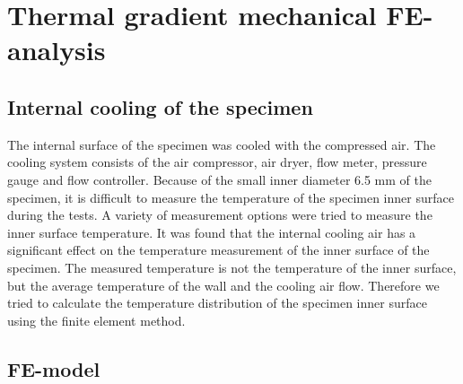 \documentclass[preprint,5p,twocolumn,11pt,sort&compress]{elsarticle}
\begin{document}
\section{Thermal gradient mechanical FE-analysis}

\subsection{Internal cooling of the specimen}

The internal surface of the specimen was cooled with the compressed air. The cooling system consists of the air compressor, air dryer, flow meter, pressure gauge and flow controller.
Because of the small inner diameter 6.5 mm of the specimen, it is difficult to measure the temperature of the specimen inner surface during the tests.
A variety of measurement options were tried to measure the inner surface temperature.
It was found that the internal cooling air has a significant effect on the temperature measurement of the inner surface of the specimen.
The measured temperature is not the temperature of the inner surface, but the average temperature of the wall and the cooling air flow.
Therefore we tried to calculate the temperature distribution of the specimen inner surface using the finite element method.


\subsection{FE-model}
\end{document}
